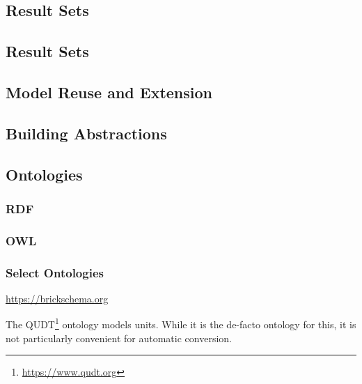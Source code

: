 \subsection{Result Sets}



\subsection{Result Sets}

\subsection{Model Reuse and Extension}



\subsection{Building Abstractions}



\subsection{Ontologies}
\subsubsection{RDF}
\subsubsection{OWL}
\subsubsection{Select Ontologies}

\url{https://brickschema.org}



The QUDT\footnote{\url{https://www.qudt.org}} ontology models units. While it is the de-facto ontology for this, it is not particularly convenient for automatic conversion.


